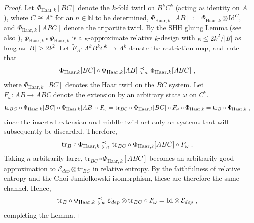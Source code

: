\documentclass[11pt,reqno]{amsart}
\newcommand{\NN}{\mathbb{N}}
\newcommand{\E}{\mathcal{E}}
\newcommand{\Id}{\mathrm{Id}}
\newcommand{\pl}{\hspace{.1cm}}
\newcommand{\tr}{\text{tr}}
\newcommand{\precsucc}[2]{\text{ } {}^{\prec {#2}}_{\succ {#1}} \text{ } }
\begin{document}
\begin{proof}
    Let $\Phi_{\mathrm{Haar},k}[BC]$ denote the $k$-fold twirl on $B^k C^k$ (acting as identity on $A$), where $C \cong A^n$ for an $n \in \NN$ to be determined, $\Phi_{\mathrm{Haar},k}[AB] := \Phi_{\mathrm{Haar},k} \otimes \Id^C$, and $\Phi_{\mathrm{Haar},k}[ABC]$ denote the tripartite twirl. By the SHH gluing Lemma \cite[Lemma 3]{schuster_random_2025} (see also \cite{laracuente_approximate_2026}), $\tilde{\Phi}_{\mathrm{Haar},k} \circ \Phi_{\mathrm{Haar},k}$ is a $\kappa$-approximate relative $k$-design with $\kappa \leq 2 k^2 / |B|$ as long as $|B| \geq 2 k^2$. Let $\tilde{E}_A : A^k B^k C^k \rightarrow A^k$ denote the restriction map, and note that
    \begin{equation}
        \Phi_{\mathrm{Haar},k}[BC] \circ  \Phi_{\mathrm{Haar},k}[AB]
            \precsucc{\kappa}{} \Phi_{\mathrm{Haar},k}[ABC] \pl,
    \end{equation}
    where $\Phi_{\mathrm{Haar},k}[BC]$ denotes the Haar twirl on the $BC$ system.
    Let $F_\omega : AB \rightarrow ABC$ denote the extension by an arbitrary state $\omega$ on $C^k$.
    \begin{equation}
    \begin{split}
        \tr_{BC} \circ \Phi_{\mathrm{Haar},k}[BC] \circ \Phi_{\mathrm{Haar},k}[AB] \circ F_\omega
            = \tr_{BC} \circ \Phi_{\mathrm{Haar},k}[BC] \circ F_\omega \circ \Phi_{\mathrm{Haar},k}
            = \tr_{B} \circ \Phi_{\mathrm{Haar},k} \pl,
    \end{split}
    \end{equation}
    since the inserted extension and middle twirl act only on systems that will subsequently be discarded. Therefore,
    \begin{equation}
        \tr_{B} \circ \Phi_{\mathrm{Haar},k} \precsucc{\kappa}{} 
            \tr_{BC} \circ \Phi_{\mathrm{Haar},k}[ABC] \circ F_\omega \pl.
    \end{equation}
    Taking $n$ arbitrarily large, $\tr_{BC} \circ \Phi_{\mathrm{Haar},k}[ABC]$ becomes an arbitrarily good approximation to $\E_{dep} \otimes \tr_{BC}$ in relative entropy. By the faithfulness of relative entropy and the Choi-Jamiolkowski isomorphism, these are therefore the same channel. Hence,
    \begin{equation}
        \tr_{B} \circ \Phi_{\mathrm{Haar},k} \precsucc{\kappa}{} 
            \E_{dep} \otimes \tr_{BC} \circ F_\omega = \Id \otimes \E_{dep} \pl,
    \end{equation}
    completing the Lemma.
\end{proof}
\end{document}
